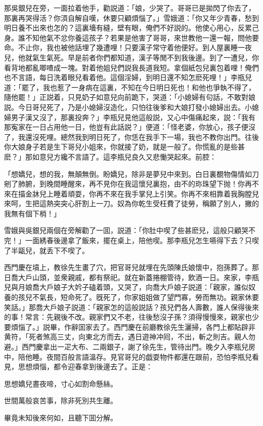 那吳銀兒在旁，一面拉着他手，勸説道：「娘，少哭了。哥哥已是拋閃了你去了，那裏再哭得活？你湏自解自嘆，休要只顧煩惱了。」雪娥道：「你又年少青春，愁到明日養不出來也怎的？這裏墻有縫，壁有眼，俺們不好説的。他使心用心，反累己身。誰不知他氣不忿你養這孩子？若果是他害了哥哥，來世教他一還一報，問他要命。不止你，我也被他話埋了幾遭哩！只要漢子常守着他便好。到人屋裏睡一夜兒，他就氣生氣死。早是前者你們都知道，漢子等閒不到我後邊。到了一遭兒，你看背地都亂唧喳成一塊。對着他姐兒們説我長道我短。拿個紙包兒裏包着哩！俺們也不言語，每日洗着眼兒看着他。這個淫婦，到明日還不知怎麽死哩！」李瓶兒道：「罷了，我也惹了一身病在這裏，不知在今日明日死也！和他也爭執不得了，隨他罷！」正説着，只見奶子如意兒向前跪下，哭道：「小媳婦有句話，不敢對娘説。今日哥兒死了，乃是小媳婦沒造化，只怕往後爹和大娘打發小媳婦出去。小媳婦男子漢又沒了，那裏投奔？」李瓶兒見他這般説，又心中傷痛起來，説：「我有那寃家在一日占用他一日，他豈有此話説？」便道：「怪老婆，你放心，孩子便沒了，我還沒死哩。總然我到明日死了，你恁在我手下一場，我也不教你出門。往後你大娘身子若是生下哥兒小姐來，你就接了奶，就是一般了。你慌亂的是些甚麽？」那如意兒方纔不言語了。這李瓶兒良久又悲慟哭起來。前腔：

\begin{myquote}
「想嬌兒，想的我，無顛無倒。盼嬌兒，除非是夢兒中來到。白日裏覩物傷情如刀剜了肺腑，到晚間睡醒來，再不見你在我這懷兒裏抱，由不的珎珠望下抛！你再不來在描金牀兒上睡着頑耍，你再不來在我手掌兒上引笑。你再不來相靠着我胸膛兒來呵，生把這熱突突心肝割上一刀。奴為你乾生受枉費了徒勞，稱願了別人，撇的我無有個下梢！」
\end{myquote}

雪娥與吳銀兒兩個在旁解勸了一囬，説道：「你肚中喫了些甚麽兒，這般只顧哭不完！」一面綉春後邊拿了飯來，擺在桌上，陪他喫。那李瓶兒怎生嚥得下去？只喫了半甌兒，就丢下不喫了。

西門慶在墳上，教徐先生畫了穴，把官哥兒就埋在先頭陳氏娘懷中，抱孫葬了。那日喬大戶山頭，並衆親戚，都有祭祀。就在新蓋捲棚管待，飲酒一日。來家，李瓶兒與月娘喬大戶娘子大妗子磕着頭，又哭了，向喬大戶娘子説道：「親家，誰似奴養的孩兒不氣長，短命死了。旣死了，你家姐姐做了望門寡，勞而無功。親家休要笑話。」那喬大戶娘子説道：「親家怎的這般説話？孩兒們各人壽數，誰人保得後來的事！常言：先親後不改。親家們又不老，往後愁沒子孫？須得慢慢來，親家也少要煩惱了。」説畢，作辭囬家去了。西門慶在前廳教徐先生灑掃，各門上都貼辟非黄符，「死者煞高三丈，向東北方而去，遇日遊神冲囘，不出，斬之則吉。親人勿避。」西門慶拿出一疋大布、二兩銀子，謝了徐先生，管待出門。晚夕入李瓶兒房中，陪他睡。夜間百般言語溫存。見官哥兒的戯耍物件都還在跟前，恐怕李瓶兒看見，思想煩惱，都令迎春拿到後邊去了。正是：

\begin{myquote}
思想嬌兒晝夜啼，寸心如割命懸絲。

世間萬般哀苦事，除非死別共生離。
\end{myquote}

畢竟未知後來何如，且聽下囬分解。

